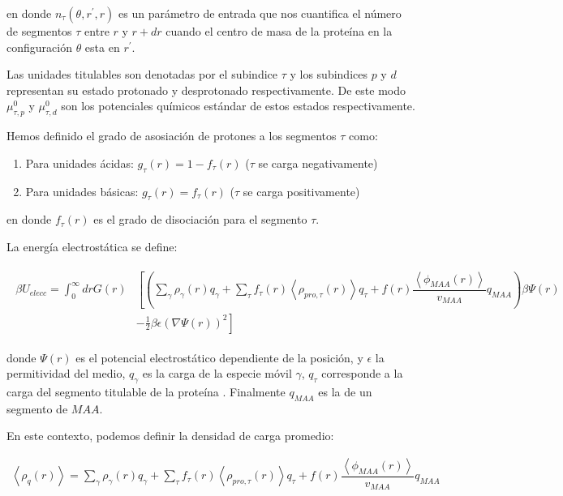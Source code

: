 \noindent en donde $n_\tau(\theta,r^\prime,r)$  es un par\'ametro de entrada que nos cuantifica el n\'umero de segmentos $\tau$ entre $r$ y $r + dr$ cuando el centro de masa de la prote\'ina en la configuraci\'on $\theta$ esta en $r^\prime$.

Las unidades titulables son denotadas por el subindice $\tau$  y los subindices $p$ y $d$ representan su estado protonado y desprotonado respectivamente. 
De este modo$\mu^0_{\tau,p}$ y $\mu^0_{\tau,d}$  son los potenciales qu\'imicos est\'andar de estos estados respectivamente.

Hemos definido el grado de asosiaci\'on de protones a los segmentos $\tau$
como: 
 
\begin{enumerate}
	\item Para unidades \'acidas: $g_\tau(r) = 1-f_\tau(r)$ ($\tau$ se carga negativamente)
	\item Para unidades b\'asicas: $g_\tau(r) = f_\tau(r)$ ($\tau$ se carga positivamente)
\end{enumerate}
\noindent en donde $f_\tau(r)$  es el grado de disociaci\'on  para el segmento $\tau$.

La energ\'ia electrost\'atica se define:

\begin{align}
	\begin{aligned}
		\beta U_{elecc}= \int_0^\infty drG(r)&\left[\left(\sum_{\gamma } {\rho_\gamma(r) q_\gamma + \sum_\tau{f_\tau(r) \left<\rho_{pro,\tau}(r)\right> q_\tau} +  f(r)\dfrac{\left<\phi_{MAA}(r)\right>}{v_{MAA}}q_{MAA}}\right)\beta\Psi(r) \right. \\ &\left.-\frac{1}{2}\beta\epsilon(\nabla\Psi(r))^2 \right]
	\end{aligned}
\end{align} 

\noindent donde $\Psi(r)$ es el potencial electrost\'atico dependiente de la posici\'on, y $\epsilon$ la permitividad del medio, $q_\gamma$ es la carga de la especie m\'ovil $\gamma$, $q_\tau$ corresponde a la carga del segmento titulable de la prote\'ina . Finalmente $q_{MAA}$ es la de un segmento de $MAA$.

En este contexto, podemos definir la densidad de carga promedio: 

\begin{align}
	\left<\rho_q(r)\right> = \sum_{\gamma } {\rho_\gamma(r) q_\gamma + \sum_\tau{f_\tau(r) \left<\rho_{pro,\tau}(r)\right> q_\tau} +  f(r)\dfrac{\left<\phi_{MAA}(r)\right>}{v_{MAA}}q_{MAA}}
	\label{eq:esf:rho-charge}
\end{align}  
             
